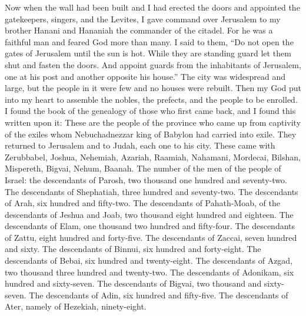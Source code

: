 \begin{biblechapter} %
\verse Now when the wall had been built and I had erected the doors and appointed the gatekeepers, singers, and the Levites,
\verse I gave command over Jerusalem to my brother Hanani and Hananiah the commander of the citadel. For he was a faithful man and feared God more than many.
\verse I said to them, “Do not open the gates of Jerusalem until the sun is hot. While they are standing guard let them shut and fasten the doors. And appoint guards from the inhabitants of Jerusalem, one at his post and another opposite his house.”
\verse The city was widespread and large, but the people in it were few and no houses were rebuilt.
 Then my God put into my heart to assemble the nobles, the prefects, and the people to be enrolled. I found the book of the genealogy of those who first came back, and I found this written upon it:
\verse These are the people of the province who came up from captivity of the exiles whom Nebuchadnezzar king of Babylon had carried into exile. They returned to Jerusalem and to Judah, each one to his city.
\verse These came with Zerubbabel, Joshua, Nehemiah, Azariah, Raamiah, Nahamani, Mordecai, Bilshan, Mispereth, Bigvai, Nehum, Baanah.
\verse The number of the men of the people of Israel:
\verse the descendants of Parosh, two thousand one hundred and seventy-two.
\verse The descendants of Shephatiah, three hundred and seventy-two.
\verse The descendants of Arah, six hundred and fifty-two.
\verse The descendants of Pahath-Moab, of the descendants of Jeshua and Joab, two thousand eight hundred and eighteen.
\verse The descendants of Elam, one thousand two hundred and fifty-four.
\verse The descendants of Zattu, eight hundred and forty-five.
\verse The descendants of Zaccai, seven hundred and sixty.
\verse The descendants of Binnui, six hundred and forty-eight.
\verse The descendants of Bebai, six hundred and twenty-eight.
\verse The descendants of Azgad, two thousand three hundred and twenty-two.
\verse The descendants of Adonikam, six hundred and sixty-seven.
\verse The descendants of Bigvai, two thousand and sixty-seven.
\verse The descendants of Adin, six hundred and fifty-five.
\verse The descendants of Ater, namely of Hezekiah, ninety-eight.

\end{biblechapter}
